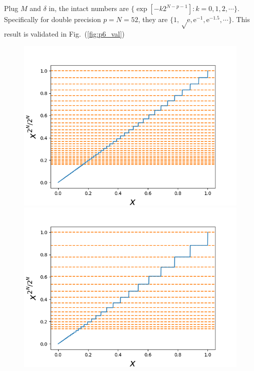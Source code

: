 \documentclass[11pt]{article}
\numberwithin{equation}{section} %
\newcommand\e{\mathrm{e}}
\begin{document}
Plug $M$ and $\delta$ in, the intact numbers are $\{\exp[-k
2^{N-p-1}]: k = 0, 1, 2, \cdots\}$.
Specifically for double precision $p = N = 52$, they are $\{1, \sqrt \e, 
  \e^{-1}, \e^{-1.5}, \cdots\}$. This result is validated in
  Fig.~(\ref{fig:p6_val})

\begin{figure}[!htp]
  \begin{minipage}[b]{0.5\linewidth}
    \centering
    \includegraphics[width=\linewidth]{p6_49.png}
  \end{minipage}%
  \begin{minipage}[b]{0.5\linewidth}
    \centering
    \includegraphics[width=\linewidth]{p6_50.png}
  \end{minipage}\\

\end{figure}
\end{document}
